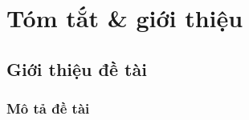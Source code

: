 \chapter{Tóm tắt \& giới thiệu}
\minitoc
\newpage
\section{Giới thiệu đề tài}
\subsection{Mô tả đề tài}
\lipsum[1-4] %
